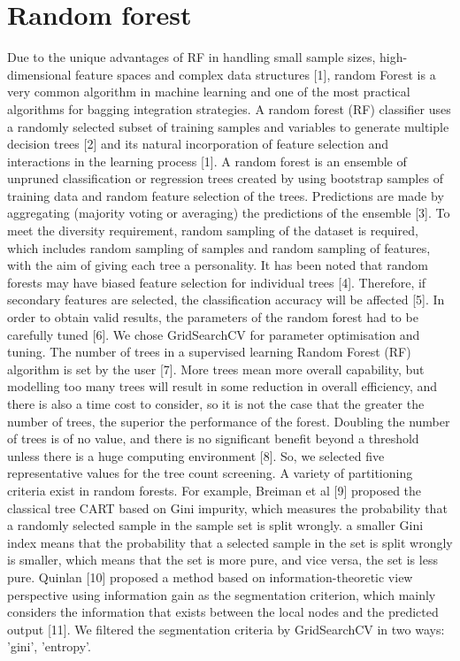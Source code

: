 \section{Random forest}
Due to the unique advantages of RF in handling small sample sizes, high-dimensional feature spaces and complex data structures [1], random Forest is a very common algorithm in machine learning and one of the most practical algorithms for bagging integration strategies. A random forest (RF) classifier uses a randomly selected subset of training samples and variables to generate multiple decision trees [2] and its natural incorporation of feature selection and interactions in the learning process [1]. A random forest is an ensemble of unpruned classification or regression trees created by using bootstrap samples of training data and random feature selection of the trees. Predictions are made by aggregating (majority voting or averaging) the predictions of the ensemble [3]. To meet the diversity requirement, random sampling of the dataset is required, which includes random sampling of samples and random sampling of features, with the aim of giving each tree a personality. It has been noted that random forests may have biased feature selection for individual trees [4]. Therefore, if secondary features are selected, the classification accuracy will be affected [5].
In order to obtain valid results, the parameters of the random forest had to be carefully tuned [6]. We chose GridSearchCV for parameter optimisation and tuning. The number of trees in a supervised learning Random Forest (RF) algorithm is set by the user [7]. More trees mean more overall capability, but modelling too many trees will result in some reduction in overall efficiency, and there is also a time cost to consider, so it is not the case that the greater the number of trees, the superior the performance of the forest. Doubling the number of trees is of no value, and there is no significant benefit beyond a threshold unless there is a huge computing environment [8]. So, we selected five representative values for the tree count screening. A variety of partitioning criteria exist in random forests. For example, Breiman et al [9] proposed the classical tree CART based on Gini impurity, which measures the probability that a randomly selected sample in the sample set is split wrongly. a smaller Gini index means that the probability that a selected sample in the set is split wrongly is smaller, which means that the set is more pure, and vice versa, the set is less pure. Quinlan [10] proposed a method based on information-theoretic view perspective using information gain as the segmentation criterion, which mainly considers the information that exists between the local nodes and the predicted output [11]. We filtered the segmentation criteria by GridSearchCV in two ways: 'gini', 'entropy'.

